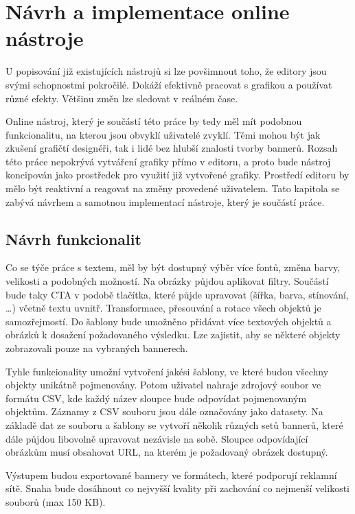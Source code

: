 \chapter{Návrh a implementace online nástroje}
\label{chap:design}
U popisování již existujících nástrojů si lze povšimnout toho, že editory jsou svými schopnostmi pokročilé.
Dokáží efektivně pracovat s grafikou a používat různé efekty. Většinu změn lze sledovat v reálném čase. 

Online nástroj, který je součástí této práce by tedy měl mít podobnou funkcionalitu, na kterou jsou obvyklí uživatelé zvyklí.
Těmi mohou být jak zkušení grafičtí designéři, tak i lidé bez hlubší znalosti tvorby bannerů.
Rozsah této práce nepokrývá vytváření grafiky přímo v editoru, a proto bude nástroj koncipován jako prostředek pro využití již vytvořené grafiky.
Prostředí editoru by mělo být reaktivní a reagovat na změny provedené uživatelem. Tato kapitola se zabývá návrhem a samotnou implementací
nástroje, který je součástí práce.

    \section{Návrh funkcionalit}
    Co se týče práce s textem, měl by být dostupný výběr více fontů, změna barvy, velikosti a podobných možností.
    Na obrázky půjdou aplikovat filtry. Součástí bude taky CTA v podobě tlačítka, které půjde upravovat (šířka, barva, stínování, \ldots) včetně textu uvnitř.
    Transformace, přesouvání a rotace všech objektů je samozřejmostí. Do šablony bude umožněno přidávat více textových objektů a obrázků k
    dosažení požadovaného výsledku. Lze zajistit, aby se některé objekty zobrazovali pouze na vybraných bannerech.

    Tyhle funkcionality umožní vytvoření jakési šablony, ve které budou všechny objekty unikátně pojmenovány.
    Potom uživatel nahraje zdrojový soubor ve formátu CSV, kde každý název sloupce bude odpovídat pojmenovaným objektům.
    Záznamy z CSV souboru jsou dále označovány jako datasety. Na základě dat ze souboru a šablony se vytvoří několik různých setů bannerů,
    které dále půjdou libovolně upravovat nezávisle na sobě. Sloupce odpovídající obrázkům musí obsahovat URL, na kterém je požadovaný obrázek dostupný.

    Výstupem budou exportované bannery ve formátech, které podporují reklamní sítě.
    Snaha bude dosáhnout co nejvyšší kvality při zachování co nejmenší velikosti souborů (max 150 KB). 

